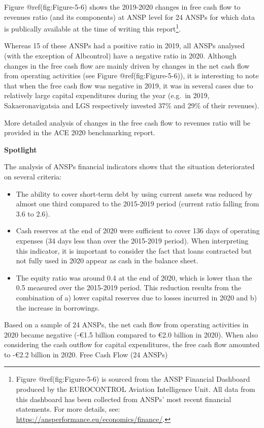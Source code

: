 \documentclass[
]{book}
\providecommand{\tightlist}{%
  \setlength{\itemsep}{0pt}\setlength{\parskip}{0pt}}
\begin{document}
Figure @ref(fig:Figure-5-6) shows the 2019-2020 changes in free cash
flow to revenues ratio (and its components) at ANSP level for 24 ANSPs
for which data is publically available at the time of writing this
report\footnote{Figure @ref(fig:Figure-5-6) is sourced from the ANSP
  Financial Dashboard produced by the EUROCONTROL Aviation Intelligence
  Unit. All data from this dashboard has been collected from ANSPs' most
  recent financial statements. For more details, see:
  \url{https://ansperformance.eu/economics/finance/}.}.

Whereas 15 of these ANSPs had a positive ratio in 2019, all ANSPs
analysed (with the exception of Albcontrol) have a negative ratio in
2020. Although changes in the free cash flow are mainly driven by
changes in the net cash flow from operating activities (see Figure
@ref(fig:Figure-5-6)), it is interesting to note that when the free cash
flow was negative in 2019, it was in several cases due to relatively
large capital expenditures during the year (e.g.~in 2019,
Sakaeronavigatsia and LGS respectively invested 37\% and 29\% of their
revenues).

More detailed analysis of changes in the free cash flow to revenues
ratio will be provided in the ACE 2020 benchmarking report.

\textbf{Spotlight}

The analysis of ANSPs financial indicators shows that the situation
deteriorated on several criteria:

\begin{itemize}
\tightlist
\item
  The ability to cover short-term debt by using current assets was
  reduced by almost one third compared to the 2015-2019 period (current
  ratio falling from 3.6 to 2.6).
\item
  Cash reserves at the end of 2020 were sufficient to cover 136 days of
  operating expenses (34 days less than over the 2015-2019 period). When
  interpreting this indicator, it is important to consider the fact that
  loans contracted but not fully used in 2020 appear as cash in the
  balance sheet.
\item
  The equity ratio was around 0.4 at the end of 2020, which is lower
  than the 0.5 measured over the 2015-2019 period. This reduction
  results from the combination of a) lower capital reserves due to
  losses incurred in 2020 and b) the increase in borrowings.
\end{itemize}

Based on a sample of 24 ANSPs, the net cash flow from operating
activities in 2020 became negative (-€1.5 billion compared to €2.0
billion in 2020). When also considering the cash outflow for capital
expenditures, the free cash flow amounted to -€2.2 billion in 2020. Free
Cash Flow (24 ANSPs)
\end{document}
